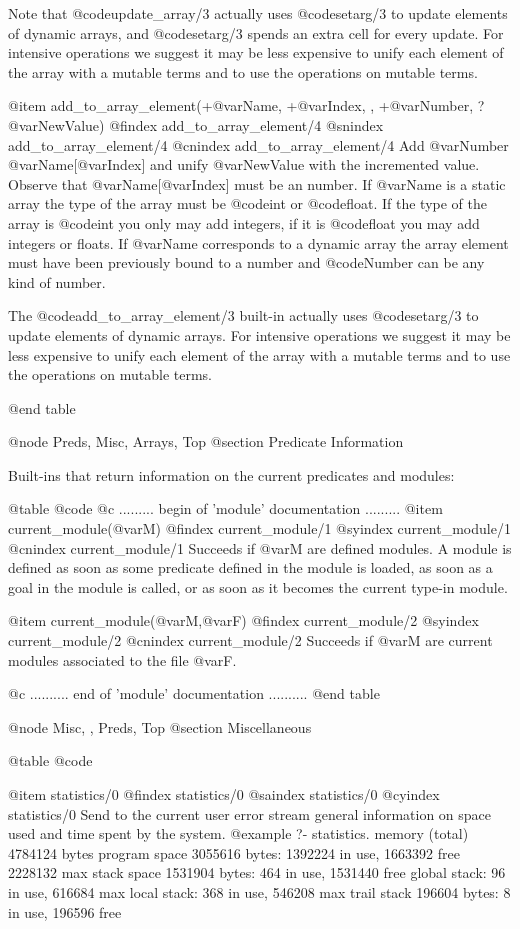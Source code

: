 {{{{{{Note that @code{update_array/3} actually uses @code{setarg/3} to update
elements of dynamic arrays, and @code{setarg/3} spends an extra cell for
every update. For intensive operations we suggest it may be less
expensive to unify each element of the array with a mutable terms and
to use the operations on mutable terms.

@item add_to_array_element(+@var{Name}, +@var{Index}, , +@var{Number}, ?@var{NewValue}) 
@findex add_to_array_element/4
@snindex add_to_array_element/4
@cnindex add_to_array_element/4
Add @var{Number} @var{Name}[@var{Index}] and unify @var{NewValue} with
the incremented value. Observe that @var{Name}[@var{Index}] must be an
number. If @var{Name} is a static array the type of the array must be
@code{int} or @code{float}. If the type of the array is @code{int} you
only may add integers, if it is @code{float} you may add integers or
floats. If @var{Name} corresponds to a dynamic array the array element
must have been previously bound to a number and @code{Number} can be
any kind of number.

The @code{add_to_array_element/3} built-in actually uses
@code{setarg/3} to update elements of dynamic arrays. For intensive
operations we suggest it may be less expensive to unify each element
of the array with a mutable terms and to use the operations on mutable
terms.

@end table

@node Preds, Misc, Arrays, Top
@section Predicate Information

Built-ins that return information on the current predicates and modules:

@table @code
@c ......... begin of 'module' documentation .........
@item current_module(@var{M})
@findex current_module/1
@syindex current_module/1
@cnindex current_module/1
Succeeds if @var{M} are defined modules. A module is defined as soon as some
predicate defined in the module is loaded, as soon as a goal in the
module is called, or as soon as it becomes the current type-in module.

@item current_module(@var{M},@var{F})
@findex current_module/2
@syindex current_module/2
@cnindex current_module/2
Succeeds if @var{M} are current modules associated to the file @var{F}.

@c .......... end of 'module' documentation ..........
@end table

@node Misc, , Preds, Top
@section Miscellaneous

@table @code

@item statistics/0
@findex statistics/0
@saindex statistics/0
@cyindex statistics/0
Send to the current user error stream general information on space used and time
spent by the system.
@example
?- statistics.
memory (total)        4784124 bytes
   program space      3055616 bytes:    1392224 in use,      1663392 free
                                                             2228132  max
   stack space        1531904 bytes:        464 in use,      1531440 free
     global stack:                           96 in use,       616684  max
      local stack:                          368 in use,       546208  max
   trail stack         196604 bytes:          8 in use,       196596 free

}}}}}}
